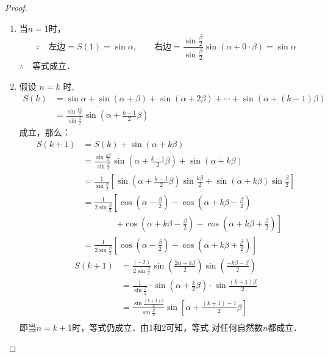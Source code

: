 \begin{proof}
\begin{enumerate}
    \item 当$n=1$时，
\[\because\quad \text{左边}=S(1)=\sin\alpha,\qquad \text{右边}=\frac{\sin\frac{\beta}{2}}{\sin\frac{\beta}{2}}\sin(\alpha+0\cdot \beta)=\sin\alpha\]
$\therefore\quad $等式成立．

\item 假设 $n=k$ 时,
\[\begin{split}
    S(k)&=\sin \alpha+\sin (\alpha+\beta)+\sin (\alpha+2 \beta)+\cdots+\sin (\alpha+(k-1) \beta) \\
&=\frac{\sin \frac{k \beta}{2}}{\sin \frac{\beta}{2}} \sin \left(\alpha+\frac{k-1}{2} \beta\right)
\end{split}\]
成立，那么：
\[\begin{split}
    S(k+1)&= S(k)+\sin(\alpha+k\beta)\\
    &=\frac{\sin \frac{k \beta}{2}}{\sin \frac{\beta}{2}} \sin \left(\alpha+\frac{k-1}{2} \beta\right)+\sin(\alpha+k\beta)\\
    &=\frac{1}{\sin \frac{\beta}{2}}\left[\sin\left(\alpha+\frac{k-1}{2}\beta\right)\sin\frac{k\beta}{2}+\sin(\alpha+k\beta)\sin\frac{\beta}{2}\right]\\
    &=\frac{1}{2\sin \frac{\beta}{2}}\left[\cos\left(\alpha-\frac{\beta}{2}\right)-\cos\left(\alpha+k\beta-\frac{\beta}{2}\right)\right. \\
    &\qquad \qquad \left. +\cos\left(\alpha+k\beta -\frac{\beta}{2}\right)-\cos\left(\alpha+k\beta+\frac{\beta}{2}\right)\right]\\
    &=\frac{1}{2\sin \frac{\beta}{2}}\left[\cos\left(\alpha-\frac{\beta}{2}\right)-\cos\left(\alpha+k\beta+\frac{\beta}{2}\right)\right]
\end{split}\]
\[\begin{split}
    S(k+1)&= \frac{(-2)}{2\sin \frac{\beta}{2}}\sin\left(\frac{2\alpha+k\beta}{2}\right)\sin\left(\frac{-k\beta-\beta}{2}\right)\\
    &=\frac{1}{\sin \frac{\beta}{2}}\cdot \sin\left(\alpha+\frac{k}{2}\beta\right)\cdot \sin\frac{(k+1)\beta}{2}\\
    &=\frac{\sin \frac{(k+1)\beta}{2}}{\sin \frac{\beta}{2}}\sin\left[\alpha+\frac{(k+1)-1}{2}\beta\right]\\
\end{split}\]
即当$n=k+1$时，等式仍成立．由1和2可知，等式
对任何自然数$n$都成立．
\end{enumerate}
\end{proof}


